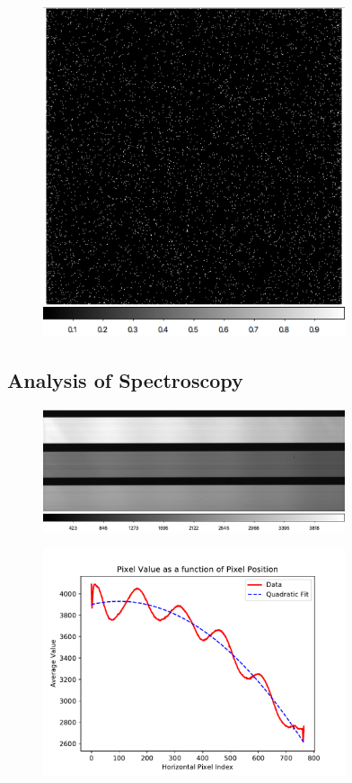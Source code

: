 \documentclass[preprint]{aastex62}
\begin{document}
        \begin{figure}
          \centering
            \includegraphics[width=3.5in]{../images/bad_pixel_map.png}
            \caption{}
          \label{fig:bad_pixel_map}
        \end{figure}
    
  \subsection{Analysis of Spectroscopy}
  
        \begin{figure}
          \centering
            \includegraphics[width=3.5in]{../images/master_DomeFlat.png}
            \caption{}
          \label{fig:master_DomeFlat}
        \end{figure}
    
    
        \begin{figure}
          \centering
            \includegraphics[width=3.5in]{../images/spectrograph_crop_fit.pdf}
            \caption{}
          \label{fig:spectrograph_crop_fit}
        \end{figure}
    
\end{document}
